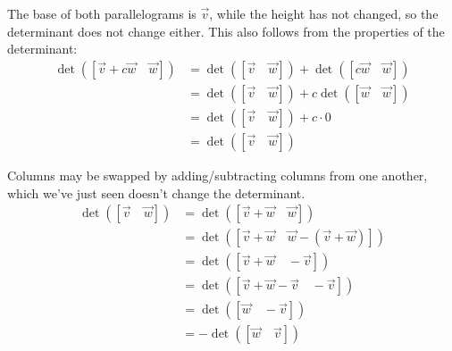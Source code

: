 \begin{applicationActivities}
\begin{observation}
\begin{center}
\end{center}

The base of both parallelograms is $\vec{v}$, while the height has not changed,
so the determinant does not change either. This also
follows from the properties of the determinant:  
  \begin{align*}
  \det([\vec{v}+c\vec{w}\hspace{1em}\vec{w}])
&=
  \det([\vec{v}\hspace{1em}\vec{w}])+
  \det([c\vec{w}\hspace{1em}\vec{w}])
\\ &=
  \det([\vec{v}\hspace{1em}\vec{w}])+
  c\det([\vec{w}\hspace{1em}\vec{w}])
\\ &=
  \det([\vec{v}\hspace{1em}\vec{w}])+
  c\cdot 0
\\ &=
  \det([\vec{v}\hspace{1em}\vec{w}])
  \end{align*}
\end{observation}

\begin{observation}
Columns may be swapped by adding/subtracting columns from one another,
which we've just seen doesn't change the determinant.  
\begin{align*}
  \det([\vec{v}\hspace{1em}\vec{w}])
&=
  \det([\vec{v}+\vec{w}\hspace{1em}\vec{w}])
\\ &=
  \det([\vec{v}+\vec{w}\hspace{1em}\vec{w}-(\vec{v}+\vec{w})])
\\ &=
  \det([\vec{v}+\vec{w}\hspace{1em}-\vec{v}])
\\ &=
  \det([\vec{v}+\vec{w}-\vec{v}\hspace{1em}-\vec{v}])
\\ &=
  \det([\vec{w}\hspace{1em}-\vec{v}])
\\ &=
  -\det([\vec{w}\hspace{1em}\vec{v}])
  \end{align*}


\end{observation}
\end{applicationActivities}
